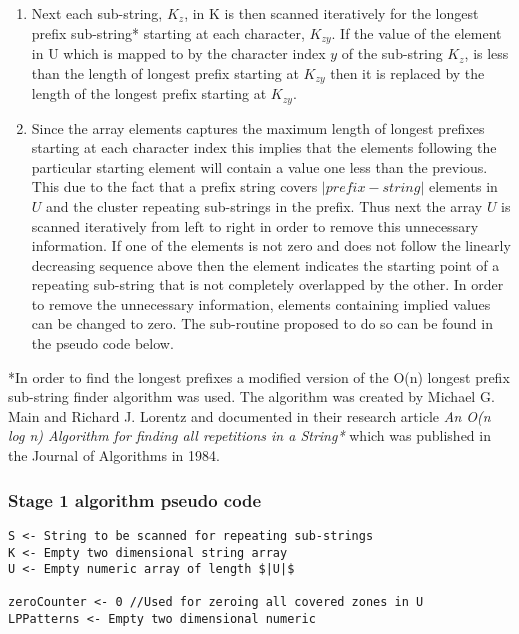 \documentclass[12pt]{article}
\begin{document}
\begin{flushleft}
\begin{enumerate}
\begin{enumerate}
			\end{enumerate}
		
		\item Next each sub-string, $K_{z}$, in K is then scanned iteratively for the longest prefix sub-string* starting at each character, $K_{zy}$. If the value of the element in U which is mapped to by the character index $y$ of the sub-string $K_{z}$, is less than the length of longest prefix starting at $K_{zy}$ then it is replaced by the length of the longest prefix starting at $K_{zy}$. \\
		
		\item Since the array elements captures the maximum length of longest prefixes starting at each character index this implies that the elements following the particular starting element will contain a value one less than the previous. This due to the fact that a prefix string covers $|prefix-string|$ elements in $U$ and the cluster repeating sub-strings in the prefix. Thus next the array $U$ is scanned iteratively from left to right in order to remove this unnecessary information. If one of the elements is not zero and does not follow the linearly decreasing sequence above then the element indicates the starting point of a repeating sub-string that is not completely overlapped by the other. In order to remove the unnecessary information, elements containing implied values can be changed to zero. The sub-routine proposed to do so can be found in the pseudo code below.   
		
		\end{enumerate}
				  
		*In order to find the longest prefixes a modified version of the O(n) longest prefix sub-string finder algorithm was used. The algorithm was created by Michael G. Main and Richard J. Lorentz and documented in their research article \textit{An O(n log n) Algorithm for finding all repetitions in a String*} which was published in the Journal of Algorithms in 1984.\\
		\newpage
		\subsubsection{Stage 1 algorithm pseudo code}
\begin{lstlisting}
S <- String to be scanned for repeating sub-strings
K <- Empty two dimensional string array
U <- Empty numeric array of length $|U|$

zeroCounter <- 0 //Used for zeroing all covered zones in U
LPPatterns <- Empty two dimensional numeric 


\end{lstlisting}
\end{flushleft}
\end{document}
